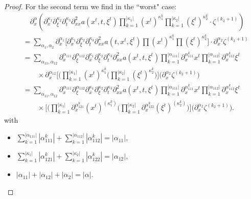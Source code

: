 \documentclass{amsart}
\theoremstyle{definition}
\begin{document}
\begin{proof}
For the second term we find in the ``worst" case:
\begin{equation*}
\begin{split}
&\quad \partial_x^{\alpha} (\partial_x^{\kappa_1} \partial_{\xi}^{\kappa_2} \partial_t^{\kappa_3} \partial^2_{xx} a(x^t,t,\xi^t) \prod_{k=1}^{|\kappa_1|} (x^t)^{\kappa_1^k} \prod_{k=1}^{|\kappa_2|} (\xi^t)^{\kappa_2^k} \cdot \zeta^{(k_2+1)} ) \\
&= \sum_{\alpha_1,\alpha_2} \partial_x^{\alpha_1} \big[ \partial_x^{\kappa_1} \partial_{\xi}^{\kappa_2} \partial_t^{\kappa_3} \partial^2_{xx} a(t,x^t,\xi^t) \prod (x^t)^{\kappa_1^k} \prod (\xi^t)^{\kappa_2^k} \big] \cdot \partial_x^{\alpha_2} \zeta^{(k_2+1)} \\
&= \sum_{\alpha_{11},\alpha_{12}} \partial_x^{\alpha_{111}} \partial_{\xi}^{\alpha_{112}} \partial_x^{\kappa_1} \partial_{\xi}^{\kappa_2} \partial_t^{\kappa_3} \partial^2_{xx} a(x^t,t,\xi^t) \prod_{k=1}^{|\alpha_{111}|} \partial_x^{\alpha_{111}^k} x^t \prod_{k=1}^{|\alpha_{112}|} \partial_x^{\alpha_{112}^k} \xi^t \\
&\quad \quad \times \partial_x^{\alpha_{12}} \big[ \big( \prod_{k=1}^{|\kappa_1|} (x^t)^{\kappa_1^k} \big( \prod_{k=1}^{|\kappa_2|} (\xi^t)^{\kappa_2^k} \big) \big] \big( \partial_x^{\alpha_2} \zeta^{(k_2+1)} \big) \\
&= \sum_{\alpha_{11},\alpha_{12}} \partial_x^{\alpha_{111}} \partial_{\xi}^{\alpha_{112}} \partial_x^{\kappa_1} \partial_{\xi}^{\kappa_2} \partial_t^{\kappa_3} \partial^2_{xx} a(x^t,t,\xi^t) \prod_{k=1}^{|\alpha_{111}|} \partial_x^{\alpha_{111}^k} x^t \prod_{k=1}^{|\alpha_{112}|} \partial_x^{\alpha_{112}^k} \xi^t \\
&\quad \quad \times \big[ \big( \prod_{k=1}^{|\kappa_1|} \partial_x^{\alpha_{121}^{k}} (x^t)^{(\kappa_1^k)} \big( \prod_{k=1}^{|\kappa_2|} \partial_x^{\alpha_{122}^{k}} (\xi^t)^{(\kappa_2^k)} \big) \big] \big( \partial_x^{\alpha_2} \zeta^{(k_2+1)} \big).
\end{split}
\end{equation*}
with
\begin{itemize}
\item $\sum_{k=1}^{|\alpha_{111}|} |\alpha_{111}^k| + \sum_{k=1}^{|\alpha_{112}|} |\alpha_{112}^k| = |\alpha_{11}|$,
\item $\sum_{k=1}^{|\kappa_1|} |\alpha_{121}^k| + \sum_{k=1}^{|\kappa_2|} |\alpha_{122}^k| = |\alpha_{12}|$, 
\item $|\alpha_{11}| + |\alpha_{12}| + |\alpha_2| = |\alpha|$.
\end{itemize}


\end{proof}
\end{document}
